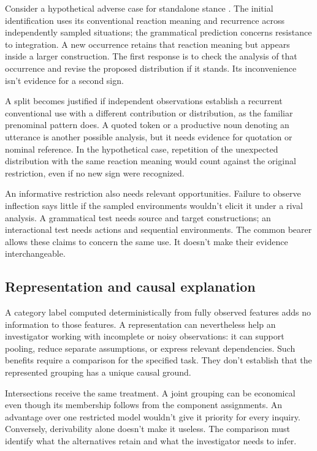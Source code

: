 Consider a hypothetical adverse case for standalone stance .
The initial identification uses its conventional reaction meaning and
recurrence across independently sampled situations; the grammatical
prediction concerns resistance to integration. A new occurrence retains
that reaction meaning but appears inside a larger construction. The
first response is to check the analysis of that occurrence and revise
the proposed distribution if it stands. Its inconvenience isn't evidence
for a second sign.

A split becomes justified if independent observations establish a
recurrent conventional use with a different contribution or distribution,
as the familiar prenominal pattern does. A quoted token or a productive
noun denoting an utterance is another possible analysis, but it needs
evidence for quotation or nominal reference. In the hypothetical case,
repetition of the unexpected distribution with the same reaction meaning
would count against the original restriction, even if no new sign
were recognized.

An informative restriction also needs relevant opportunities. Failure
to observe inflection says little if the sampled environments wouldn't
elicit it under a rival analysis. A grammatical test needs source and
target constructions; an interactional test needs actions and sequential
environments. The common bearer allows these claims to concern the
same use. It doesn't make their evidence interchangeable.

\subsection{Representation and causal explanation}

A category label computed deterministically from fully observed features
adds no information to those features. A representation can nevertheless
help an investigator working with incomplete or noisy observations:
it can support pooling, reduce separate assumptions, or express relevant
dependencies. Such benefits require a comparison for the specified task.
They don't establish that the represented grouping has a unique causal
ground.

Intersections receive the same treatment. A joint grouping can be
economical even though its membership follows from the component
assignments. An advantage over one restricted model wouldn't give it
priority for every inquiry. Conversely, derivability alone doesn't make
it useless. The comparison must identify what the alternatives retain
and what the investigator needs to infer.

